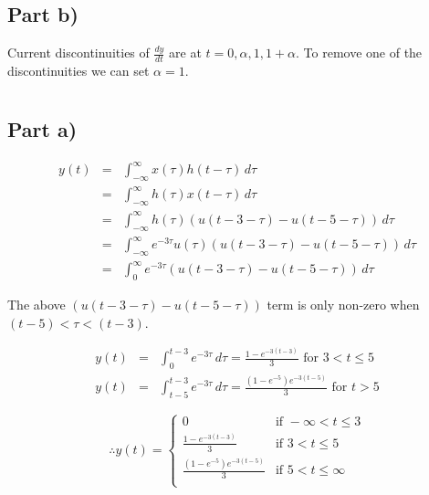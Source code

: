\documentclass[20pt]{article}
\begin{document}
\subsection*{Part b)}

Current discontinuities of $ \frac{dy}{d t} $ are at $ t = 0, \alpha, 1, 1 + \alpha $. To remove one of the discontinuities we can set $ \alpha = 1 $.

\section{}

\subsection*{Part a)}

\begin{eqnarray}
    y(t) &=& \int_{-\infty}^{\infty} x(\tau) h(t-\tau)  \,d\tau \\
    &=& \int_{-\infty}^{\infty} h(\tau) x(t-\tau)  \,d\tau \\
    &=& \int_{-\infty}^{\infty} h(\tau) (u(t-3-\tau) - u(t-5-\tau)) \,d\tau \\
    &=& \int_{-\infty}^{\infty} e^{-3\tau} u(\tau) (u(t-3-\tau) - u(t-5-\tau)) \,d\tau \\
    &=& \int_{0}^{\infty}  e^{-3\tau} (u(t-3-\tau) - u(t-5-\tau)) \,d\tau
\end{eqnarray}

The above $(u(t-3-\tau) - u(t-5-\tau))$ term is only non-zero when $ (t-5) < \tau < (t-3) $.

\begin{eqnarray}
    y(t) &=& \int_{0}^{t-3}  e^{-3\tau} \,d\tau = \frac{1-e^{-3(t-3)}}{3}  \text{ for } 3 < t \leq 5 \\
    y(t) &=& \int_{t-5}^{t-3}  e^{-3\tau} \,d\tau = \frac{(1-e^{-5})e^{-3(t-5)}}{3}  \text{ for } t > 5
\end{eqnarray}

\begin{equation}
    \therefore y(t)=
    \begin{cases}
        0                               & \text{if } -\infty < t \leq 3 \\
        \frac{1-e^{-3(t-3)}}{3}         & \text{if } 3 < t \leq 5       \\
        \frac{(1-e^{-5})e^{-3(t-5)}}{3} & \text{if } 5 < t \leq \infty  \\
    \end{cases}
\end{equation}
\end{document}
